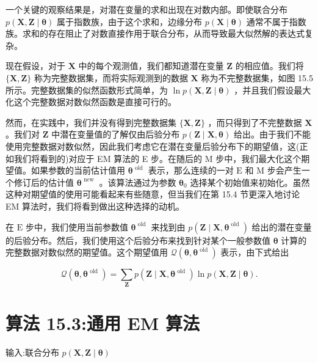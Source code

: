 \documentclass[10pt]{report}
\begin{document}
一个关键的观察结果是，对潜在变量的求和出现在对数内部。即使联合分布 \(p\left( {\mathbf{X},\mathbf{Z} \mid  \mathbf{\theta }}\right)\) 属于指数族，由于这个求和，边缘分布 \(p\left( {\mathbf{X} \mid  \mathbf{\theta }}\right)\) 通常不属于指数族。求和的存在阻止了对数直接作用于联合分布，从而导致最大似然解的表达式复杂。

现在假设，对于 \(\mathbf{X}\) 中的每个观测值，我们都知道潜在变量 \(\mathbf{Z}\) 的相应值。我们将 \(\{ \mathbf{X},\mathbf{Z}\}\) 称为完整数据集，而将实际观测到的数据 \(\mathbf{X}\) 称为不完整数据集，如图 15.5 所示。完整数据集的似然函数形式简单，为 \(\ln p\left( {\mathbf{X},\mathbf{Z} \mid  \mathbf{\theta }}\right)\) ，并且我们假设最大化这个完整数据对数似然函数是直接可行的。

然而，在实践中，我们并没有得到完整数据集 \(\{ \mathbf{X},\mathbf{Z}\}\) ，而只得到了不完整数据 \(\mathbf{X}\) 。我们对 \(\mathbf{Z}\) 中潜在变量值的了解仅由后验分布 \(p\left( {\mathbf{Z} \mid  \mathbf{X},\mathbf{\theta }}\right)\) 给出。由于我们不能使用完整数据对数似然，因此我们考虑它在潜在变量后验分布下的期望值，这(正如我们将看到的)对应于 EM 算法的 E 步。在随后的 M 步中，我们最大化这个期望值。如果参数的当前估计值用 \({\mathbf{\theta }}^{\text{ old }}\) 表示，那么连续的一对 \(\mathrm{E}\) 和 \(\mathrm{M}\) 步会产生一个修订后的估计值 \({\mathbf{\theta }}^{\text{ new }}\) 。该算法通过为参数 \({\mathbf{\theta }}_{0}\) 选择某个初始值来初始化。虽然这种对期望值的使用可能看起来有些随意，但当我们在第 15.4 节更深入地讨论 EM 算法时，我们将看到做出这种选择的动机。

在 \(\mathrm{E}\) 步中，我们使用当前参数值 \({\mathbf{\theta }}^{\text{ old }}\) 来找到由 \(p\left( {\mathbf{Z} \mid  \mathbf{X},{\mathbf{\theta }}^{\text{ old }}}\right)\) 给出的潜在变量的后验分布。然后，我们使用这个后验分布来找到针对某个一般参数值 \(\mathbf{\theta }\) 计算的完整数据对数似然的期望值。这个期望值用 \(\mathcal{Q}\left( {\mathbf{\theta },{\mathbf{\theta }}^{\text{ old }}}\right)\) 表示，由下式给出

\[
\mathcal{Q}\left( {\mathbf{\theta },{\mathbf{\theta }}^{\text{ old }}}\right)  = \mathop{\sum }\limits_{\mathbf{Z}}p\left( {\mathbf{Z} \mid  \mathbf{X},{\mathbf{\theta }}^{\text{ old }}}\right) \ln p\left( {\mathbf{X},\mathbf{Z} \mid  \mathbf{\theta }}\right) . \tag{15.23}
\]

\section*{算法 15.3:通用 EM 算法}

输入:联合分布 \(p\left( {\mathbf{X},\mathbf{Z} \mid  \mathbf{\theta }}\right)\)
\end{document}

